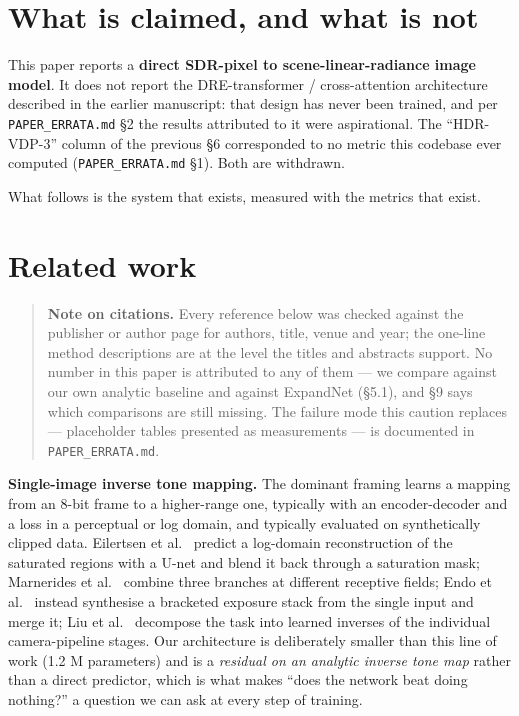 \hypertarget{what-is-claimed-and-what-is-not}{%
\section{What is claimed, and what is not}\label{what-is-claimed-and-what-is-not}}

This paper reports a \textbf{direct SDR-pixel to scene-linear-radiance image model}.
It does not report the DRE-transformer / cross-attention architecture described
in the earlier manuscript: that design has never been trained, and per
\texttt{PAPER\_ERRATA.md} §2 the results attributed to it were aspirational. The
``HDR-VDP-3'' column of the previous §6 corresponded to no metric this codebase
ever computed (\texttt{PAPER\_ERRATA.md} §1). Both are withdrawn.

What follows is the system that exists, measured with the metrics that exist.

\hypertarget{related-work}{%
\section{Related work}\label{related-work}}

\begin{quote}
\textbf{Note on citations.} Every reference below was checked against the publisher or
author page for authors, title, venue and year; the one-line method
descriptions are at the level the titles and abstracts support. No number in
this paper is attributed to any of them --- we compare against our own analytic
baseline and against ExpandNet (§5.1), and §9 says which comparisons are still
missing. The failure mode
this caution replaces --- placeholder tables presented as measurements --- is
documented in \texttt{PAPER\_ERRATA.md}.
\end{quote}

\textbf{Single-image inverse tone mapping.} The dominant framing learns a mapping
from an 8-bit frame to a higher-range one, typically with an encoder-decoder and
a loss in a perceptual or log domain, and typically evaluated on synthetically
clipped data. Eilertsen et al.~\cite{eilertsen2017} predict a log-domain reconstruction of the
saturated regions with a U-net and blend it back through a saturation mask;
Marnerides et al.~\cite{marnerides2018} combine three branches at different receptive fields;
Endo et al.~\cite{endo2017} instead synthesise a bracketed exposure stack from the single
input and merge it; Liu et al.~\cite{liu2020} decompose the task into learned inverses of
the individual camera-pipeline stages. Our architecture is deliberately smaller
than this line of work (1.2 M parameters) and is a \emph{residual on an analytic
inverse tone map} rather than a direct predictor, which is what makes ``does the
network beat doing nothing?'' a question we can ask at every step of training.

